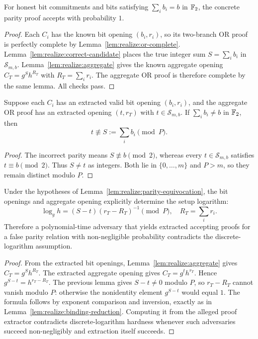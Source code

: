 \begin{theorem}\label{thm:realize:parity-complete}
For honest bit commitments and bits satisfying
$\sum_i b_i=b$ in $\mathbb{F}_2$, the concrete
parity proof accepts with probability $1$.
\end{theorem}
\begin{proof}
Each $C_i$ has the known bit opening
$(b_i,r_i)$, so its two-branch OR proof
is perfectly complete by
Lemma~\ref{lem:realize:or-complete}.
Lemma~\ref{lem:realize:correct-candidate}
places the true integer sum
$S=\sum_i b_i$ in $\mathcal S_{m,b}$.
Lemma~\ref{lem:realize:aggregate}
gives the known aggregate opening
$C_T=g^S h^{R_T}$ with
$R_T=\sum_i r_i$.
The aggregate OR proof is therefore
complete by the same lemma.
All checks pass.
\end{proof}

\begin{lemma}\label{lem:realize:parity-equivocation}
Suppose each $C_i$ has an extracted
valid bit opening $(b_i,r_i)$, and the
aggregate OR proof has an extracted
opening $(t,r_T)$ with
$t\in\mathcal S_{m,b}$.
If $\sum_i b_i\neq b$ in $\mathbb{F}_2$,
then
\[
 t\not\equiv S:=\sum_i b_i\pmod P.
\]
\end{lemma}
\begin{proof}
The incorrect parity means
$S\not\equiv b\pmod2$,
whereas every $t\in\mathcal S_{m,b}$
satisfies $t\equiv b\pmod2$.
Thus $S\neq t$ as integers.
Both lie in $\{0,\ldots,m\}$ and
$P>m$, so they remain distinct
modulo $P$.
\end{proof}

\begin{theorem}\label{thm:realize:parity-binding}
Under the hypotheses of
Lemma~\ref{lem:realize:parity-equivocation},
the bit openings and aggregate opening
explicitly determine the setup logarithm:
\[
 \boxed{
 \log_g h=(S-t)(r_T-R_T)^{-1}\pmod P,
 \quad R_T=\sum_i r_i.}
\]
Therefore a polynomial-time adversary
that yields extracted accepting proofs for
a false parity relation with non-negligible
probability contradicts the discrete-logarithm
assumption.
\end{theorem}
\begin{proof}
From the extracted bit openings,
Lemma~\ref{lem:realize:aggregate} gives
$C_T=g^S h^{R_T}$.
The extracted aggregate opening gives
$C_T=g^t h^{r_T}$.
Hence $g^{S-t}=h^{r_T-R_T}$.
The previous lemma gives
$S-t\ne0$ modulo $P$, so
$r_T-R_T$ cannot vanish modulo $P$:
otherwise the nonidentity element
$g^{S-t}$ would equal $1$.
The formula follows by exponent comparison
and inversion, exactly as in
Lemma~\ref{lem:realize:binding-reduction}.
Computing it from the alleged proof
extractor contradicts discrete-logarithm
hardness whenever such adversaries succeed
non-negligibly and extraction itself succeeds.
\end{proof}

